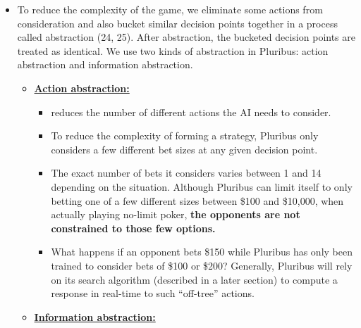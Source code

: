 \documentclass[
]{article}
\begin{document}
\begin{itemize}
  \begin{itemize}
  \item
    To reduce the complexity of the game, we eliminate some actions from
    consideration and also bucket similar decision points together in a
    process called abstraction (24, 25). After abstraction, the bucketed
    decision points are treated as identical. We use two kinds of
    abstraction in Pluribus: action abstraction and information
    abstraction.

    \begin{itemize}
    \item
      \textbf{\ul{Action abstraction:}}

      \begin{itemize}
      \item
        reduces the number of different actions the AI needs to
        consider.
      \item
        To reduce the complexity of forming a strategy, Pluribus only
        considers a few different bet sizes at any given decision point.
      \item
        The exact number of bets it considers varies between 1 and 14
        depending on the situation. Although Pluribus can limit itself
        to only betting one of a few different sizes between \$100 and
        \$10,000, when actually playing no-limit poker, \textbf{the
        opponents are not constrained to those few options.}
      \item
        What happens if an opponent bets \$150 while Pluribus has only
        been trained to consider bets of \$100 or \$200? Generally,
        Pluribus will rely on its search algorithm (described in a later
        section) to compute a response in real-time to such ``off-tree''
        actions.
      \end{itemize}
    \item
      \textbf{\ul{Information abstraction:}}


\end{itemize}
\end{itemize}
\end{itemize}
\end{document}
